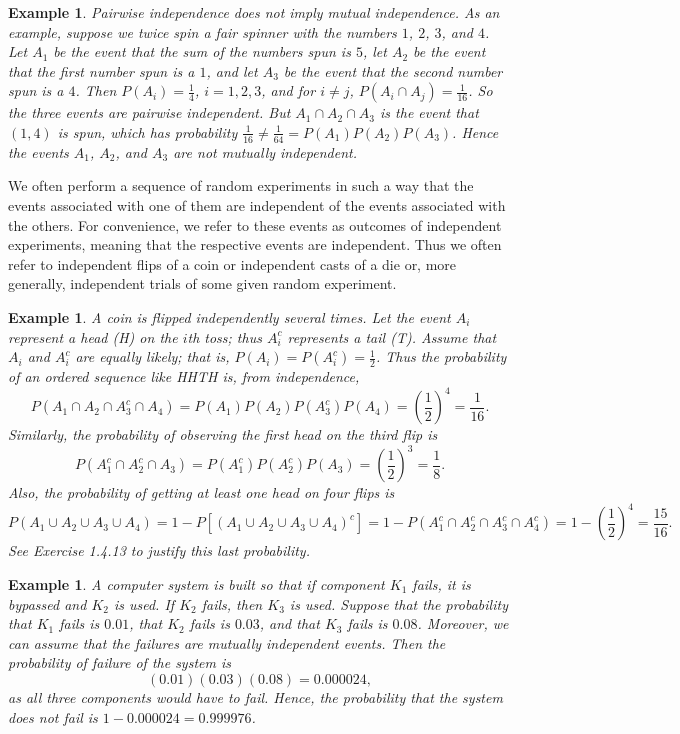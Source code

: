 \documentclass[12pt]{article}
\newtheorem{example}[theorem]{Example}
\newcommand{\1}{{\bf 1}}
\newcommand{\2}{{\bf 2}}
\begin{document}
\begin{example}
Pairwise independence does not imply mutual independence. As an example, suppose we twice spin a fair spinner with the numbers $1$, $2$, $3$, and $4$. Let $A_1$ be the event that the sum of the numbers spun is $5$, let $A_2$ be the event that the first number spun is a $1$, and let $A_3$ be the event that the second number spun is a $4$. Then $P(A_i) = \frac{1}{4}$, $i = 1, 2, 3$, and for $i \neq j$, $P(A_i \cap A_j) = \frac{1}{16}$. So the three events are pairwise independent. But $A_1 \cap A_2 \cap A_3$ is the event that $(1, 4)$ is spun, which has probability $\frac{1}{16} \neq \frac{1}{64} = P(A_1)P(A_2)P(A_3)$. Hence the events $A_1$, $A_2$, and $A_3$ are not mutually independent.
\end{example}

We often perform a sequence of random experiments in such a way that the events associated with one of them are independent of the events associated with the others. For convenience, we refer to these events as outcomes of independent experiments, meaning that the respective events are independent. Thus we often refer to independent flips of a coin or independent casts of a die or, more generally, independent trials of some given random experiment.

\begin{example}
A coin is flipped independently several times. Let the event $A_i$ represent a head (H) on the $i$th toss; thus $A_i^c$ represents a tail (T). Assume that $A_i$ and $A_i^c$ are equally likely; that is, $P(A_i) = P(A_i^c) = \frac{1}{2}$. Thus the probability of an ordered sequence like HHTH is, from independence,
\[
P(A_1 \cap A_2 \cap A_3^c \cap A_4) = P(A_1)P(A_2)P(A_3^c)P(A_4) = \left(\frac{1}{2}\right)^4 = \frac{1}{16}.
\]
Similarly, the probability of observing the first head on the third flip is
\[
P(A_1^c \cap A_2^c \cap A_3) = P(A_1^c)P(A_2^c)P(A_3) = \left(\frac{1}{2}\right)^3 = \frac{1}{8}.
\]
Also, the probability of getting at least one head on four flips is
\[
P(A_1 \cup A_2 \cup A_3 \cup A_4) = 1 - P[(A_1 \cup A_2 \cup A_3 \cup A_4)^c] = 1 - P(A_1^c \cap A_2^c \cap A_3^c \cap A_4^c) = 1 - \left(\frac{1}{2}\right)^4 = \frac{15}{16}.
\]
See Exercise 1.4.13 to justify this last probability.
\end{example}

\begin{example}
A computer system is built so that if component $K_1$ fails, it is bypassed and $K_2$ is used. If $K_2$ fails, then $K_3$ is used. Suppose that the probability that $K_1$ fails is $0.01$, that $K_2$ fails is $0.03$, and that $K_3$ fails is $0.08$. Moreover, we can assume that the failures are mutually independent events. Then the probability of failure of the system is
\[
(0.01)(0.03)(0.08) = 0.000024,
\]
as all three components would have to fail. Hence, the probability that the system does not fail is $1 - 0.000024 = 0.999976$.
\end{example}
\end{document}

